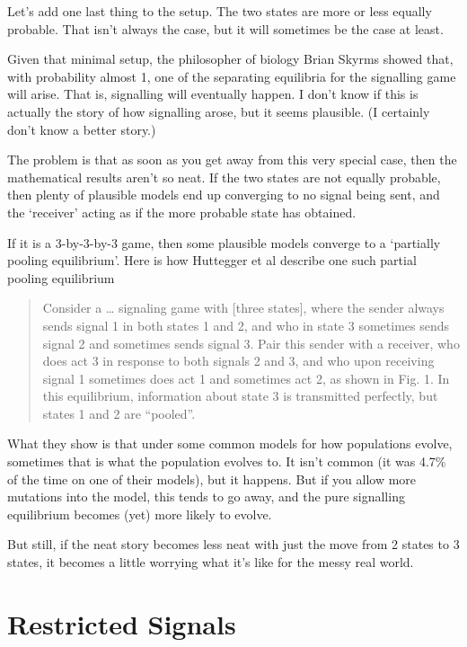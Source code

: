 \documentclass[11pt,]{article}
\begin{document}
Let's add one last thing to the setup. The two states are more or less
equally probable. That isn't always the case, but it will sometimes be
the case at least.

Given that minimal setup, the philosopher of biology Brian Skyrms showed
that, with probability almost 1, one of the separating equilibria for
the signalling game will arise. That is, signalling will eventually
happen. I don't know if this is actually the story of how signalling
arose, but it seems plausible. (I certainly don't know a better story.)

The problem is that as soon as you get away from this very special case,
then the mathematical results aren't so neat. If the two states are not
equally probable, then plenty of plausible models end up converging to
no signal being sent, and the `receiver' acting as if the more probable
state has obtained.

If it is a 3-by-3-by-3 game, then some plausible models converge to a
`partially pooling equilibrium'. Here is how Huttegger et al describe
one such partial pooling equilibrium

\begin{quote}
Consider a \ldots{} signaling game with {[}three states{]}, where the
sender always sends signal 1 in both states 1 and 2, and who in state 3
sometimes sends signal 2 and sometimes sends signal 3. Pair this sender
with a receiver, who does act 3 in response to both signals 2 and 3, and
who upon receiving signal 1 sometimes does act 1 and sometimes act 2, as
shown in Fig. 1. In this equilibrium, information about state 3 is
transmitted perfectly, but states 1 and 2 are ``pooled''.
\end{quote}

What they show is that under some common models for how populations
evolve, sometimes that is what the population evolves to. It isn't
common (it was 4.7\% of the time on one of their models), but it
happens. But if you allow more mutations into the model, this tends to
go away, and the pure signalling equilibrium becomes (yet) more likely
to evolve.

But still, if the neat story becomes less neat with just the move from 2
states to 3 states, it becomes a little worrying what it's like for the
messy real world.

\hypertarget{restricted-signals}{%
\section{Restricted Signals}\label{restricted-signals}}
\end{document}
